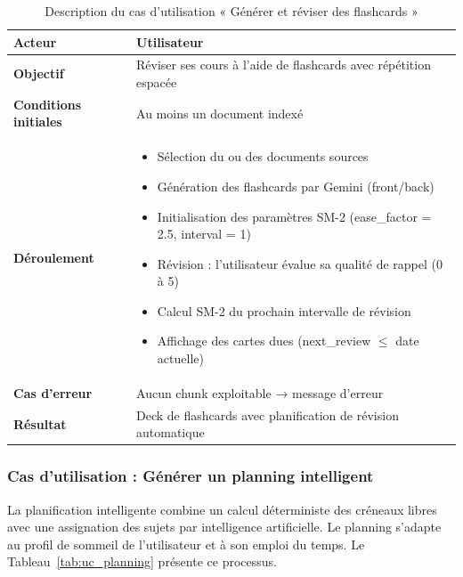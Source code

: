 \begin{table}[H]
\centering
\renewcommand{\arraystretch}{1.2}
\begin{tabular}{|p{4cm}|p{10cm}|}
\hline
\textbf{Acteur} & Utilisateur \\ \hline

\textbf{Objectif} & Réviser ses cours à l'aide de flashcards avec répétition espacée \\ \hline

\textbf{Conditions initiales} & Au moins un document indexé \\ \hline

\textbf{Déroulement} &
\begin{itemize}
    \item Sélection du ou des documents sources
    \item Génération des flashcards par Gemini (front/back)
    \item Initialisation des paramètres SM-2 (ease\_factor = 2.5, interval = 1)
    \item Révision : l'utilisateur évalue sa qualité de rappel (0 à 5)
    \item Calcul SM-2 du prochain intervalle de révision
    \item Affichage des cartes dues (next\_review $\leq$ date actuelle)
\end{itemize} \\ \hline

\textbf{Cas d'erreur} & Aucun chunk exploitable → message d'erreur \\ \hline

\textbf{Résultat} & Deck de flashcards avec planification de révision automatique \\ \hline
\end{tabular}
\caption{Description du cas d'utilisation « Générer et réviser des flashcards »}
\label{tab:uc_flashcard}
\end{table}

\subsubsection{Cas d'utilisation : Générer un planning intelligent}

La planification intelligente combine un calcul déterministe des créneaux libres avec une assignation des sujets par intelligence artificielle. Le planning s'adapte au profil de sommeil de l'utilisateur et à son emploi du temps. Le Tableau~\ref{tab:uc_planning} présente ce processus.

